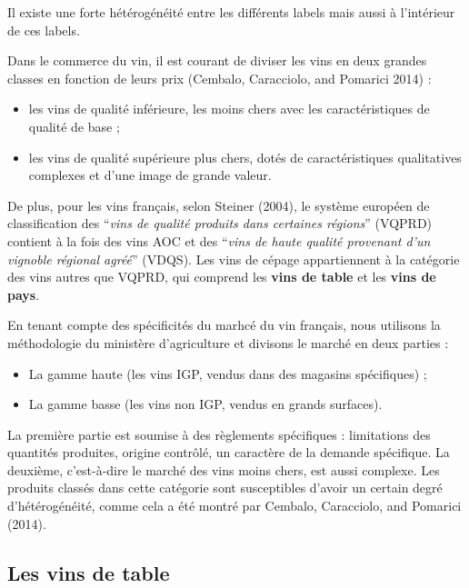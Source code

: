 \documentclass[11pt,]{article}
\providecommand{\tightlist}{%
  \setlength{\itemsep}{0pt}\setlength{\parskip}{0pt}}
\begin{document}
Il existe une forte hétérogénéité entre les différents labels mais aussi
à l'intérieur de ces labels.

Dans le commerce du vin, il est courant de diviser les vins en deux
grandes classes en fonction de leurs prix (Cembalo, Caracciolo, and
Pomarici 2014) :

\begin{itemize}
\tightlist
\item
  les vins de qualité inférieure, les moins chers avec les
  caractéristiques de qualité de base ;
\item
  les vins de qualité supérieure plus chers, dotés de caractéristiques
  qualitatives complexes et d'une image de grande valeur.
\end{itemize}

De plus, pour les vins français, selon Steiner (2004), le système
européen de classification des ``\emph{vins de qualité produits dans
certaines régions}'' (VQPRD) contient à la fois des vins AOC et des
``\emph{vins de haute qualité provenant d'un vignoble régional agréé}''
(VDQS). Les vins de cépage appartiennent à la catégorie des vins autres
que VQPRD, qui comprend les \textbf{vins de table} et les
\textbf{vins de pays}.

En tenant compte des spécificités du marhcé du vin français, nous
utilisons la méthodologie du ministère d'agriculture et divisons le
marché en deux parties :

\begin{itemize}
\tightlist
\item
  La gamme haute (les vins IGP, vendus dans des magasins spécifiques) ;
\item
  La gamme basse (les vins non IGP, vendus en grands surfaces).
\end{itemize}

La première partie est soumise à des règlements spécifiques :
limitations des quantités produites, origine contrôlé, un caractère de
la demande spécifique. La deuxième, c'est-à-dire le marché des vins
moins chers, est aussi complexe. Les produits classés dans cette
catégorie sont susceptibles d'avoir un certain degré d'hétérogénéité,
comme cela a été montré par Cembalo, Caracciolo, and Pomarici (2014).

\hypertarget{les-vins-de-table}{%
\subsection{Les vins de table}\label{les-vins-de-table}}
\end{document}
